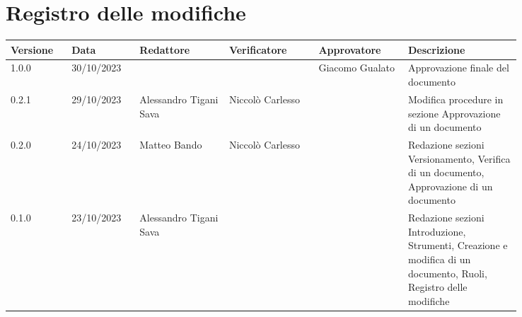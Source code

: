 \section*{Registro delle modifiche}
 {
  \scriptsize
  \begin{tabular}{p{0.10\linewidth}p{0.10\linewidth}p{0.15\linewidth}p{0.15\linewidth}p{0.15\linewidth}p{0.19\linewidth}}
	  \textbf{Versione} & \textbf{Data} & \textbf{Redattore}     & \textbf{Verificatore} & \textbf{Approvatore} & \textbf{Descrizione}                                                                                             \\
	  \hline
	  1.0.0             & 30/10/2023    &                        &                       & Giacomo Gualato      & Approvazione finale del documento                                                                                \\
	  \hline
	  0.2.1             & 29/10/2023    & Alessandro Tigani Sava & Niccolò Carlesso      &                      & Modifica procedure in sezione Approvazione di un documento                                                       \\
	  \hline
	  0.2.0             & 24/10/2023    & Matteo Bando           & Niccolò Carlesso      &                      & Redazione sezioni Versionamento, Verifica di un documento, Approvazione di un documento                          \\
	  \hline
	  0.1.0             & 23/10/2023    & Alessandro Tigani Sava &                       &                      & Redazione sezioni Introduzione, Strumenti, Creazione e modifica di un documento, Ruoli, Registro delle modifiche \\
	  \hline
  \end{tabular}
 }
